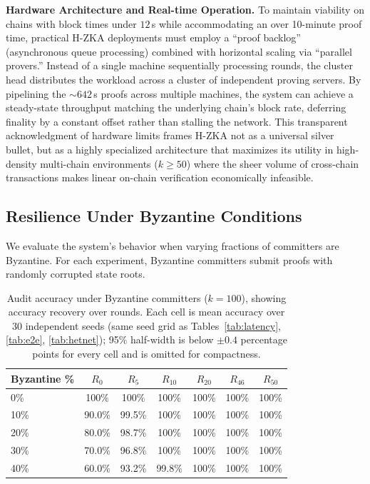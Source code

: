 \documentclass[journal]{IEEEtran}
\begin{document}
\textbf{Hardware Architecture and Real-time Operation.}
To maintain viability on chains with block times under $12\,$s while accommodating an over 10-minute proof time, practical H-ZKA deployments must employ a ``proof backlog'' (asynchronous queue processing) combined with horizontal scaling via ``parallel provers.'' Instead of a single machine sequentially processing rounds, the cluster head distributes the workload across a cluster of independent proving servers. By pipelining the $\sim 642\,$s proofs across multiple machines, the system can achieve a steady-state throughput matching the underlying chain's block rate, deferring finality by a constant offset rather than stalling the network. This transparent acknowledgment of hardware limits frames H-ZKA not as a universal silver bullet, but as a highly specialized architecture that maximizes its utility in high-density multi-chain environments ($k \ge 50$) where the sheer volume of cross-chain transactions makes linear on-chain verification economically infeasible.

\subsection{Resilience Under Byzantine Conditions}

We evaluate the system's behavior when varying fractions of committers are Byzantine. For each experiment, Byzantine committers submit proofs with randomly corrupted state roots.

\begin{table}[t]
\centering

\caption{Audit accuracy under Byzantine committers ($k=100$), showing accuracy recovery over rounds. Each cell is mean accuracy over $30$ independent seeds (same seed grid as Tables~\ref{tab:latency}, \ref{tab:e2e}, \ref{tab:hetnet}); 95\% half-width is below $\pm 0.4$ percentage points for every cell and is omitted for compactness.}
\label{tab:byzantine}
\begin{tabular}{lcccccc}
\toprule
Byzantine \% & $R_0$ & $R_5$ & $R_{10}$ & $R_{20}$ & $R_{46}$ & $R_{50}$ \\
\midrule
0\%  & 100\% & 100\% & 100\% & 100\% & 100\% & 100\% \\
10\% & 90.0\%  & 99.5\% & 100\% & 100\% & 100\% & 100\% \\
20\% & 80.0\%  & 98.7\% & 100\% & 100\% & 100\% & 100\% \\
30\% & 70.0\%  & 96.8\% & 100\% & 100\% & 100\% & 100\% \\
40\% & 60.0\%  & 93.2\% & 99.8\% & 100\% & 100\% & 100\% \\
\bottomrule
\end{tabular}
\end{table}
\end{document}
